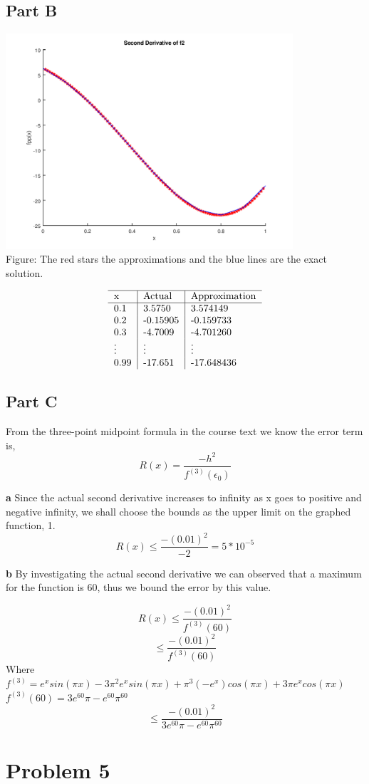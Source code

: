 \documentclass{article}
\begin{document}
\subsection*{Part B}
\includegraphics[height=8cm]{problem4b.png}\\
Figure: The red stars the approximations and the blue lines are the exact solution. 

$$\begin{tabular}{l | l | l } 
	\hline
	x & Actual & Approximation \\
	\hline
	0.1 &  3.5750 & 3.574149 \\
	0.2 & -0.15905 & -0.159733 \\
	0.3 & -4.7009 & -4.701260 \\
	\vdots & \vdots & \vdots \\
	0.99 & -17.651 & -17.648436\\
\end{tabular}$$


\subsection*{Part C}
From the three-point midpoint formula in the course text we know the error term is, 
$$ R(x) = \frac{-h^2}{f^{(3)}(\epsilon_0 )} $$

\textbf{a}
Since the actual second derivative increases to infinity as x goes to positive and negative infinity, we shall choose the bounds as the upper limit on the graphed function, 1. 
$$ R(x) \leq \frac{-(0.01)^2}{-2} = 5*10^{-5}$$

\textbf{b}
By investigating the actual second derivative we can observed that a maximum for the function is 60, thus we bound the error by this value. 

$$ R(x) \leq \frac{-(0.01)^2}{f^{(3)}(60 )} $$
$$  \leq \frac{-(0.01)^2}{f^{(3)}(60 )} $$
Where $f^{(3)} = e^xsin(\pi x)-3 \pi^2 e^x sin(\pi x) + \pi^3 (-e^x)cos(\pi x) + 3 \pi e^x cos(\pi x)$\\
$f^{(3)}(60) = 3e^{60} \pi - e^{60} \pi^{60}$
$$  \leq \frac{-(0.01)^2}{ 3e^{60} \pi - e^{60} \pi^{60} } $$

\section*{Problem 5}
\end{document}
